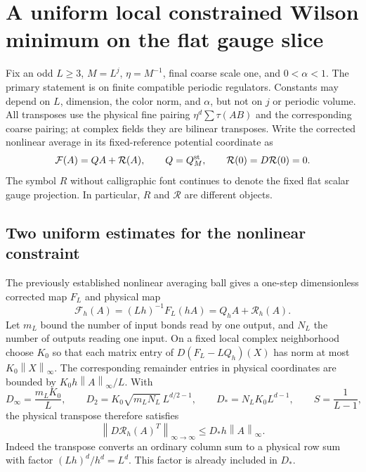 \documentclass[11pt]{article}
\theoremstyle{remark}\newtheorem{remark}[theorem]{Remark}
\newcommand{\norm}[1]{\left\lVert#1\right\rVert}
\begin{document}

\section{A uniform local constrained Wilson minimum on the flat gauge slice}
\label{nm-section}

Fix an odd $L\ge3$, $M=L^j$, $\eta=M^{-1}$, final coarse scale one,
and $0<\alpha<1$. The primary statement is on finite compatible
periodic regulators. Constants may depend on $L$, dimension, the
color norm, and $\alpha$, but not on $j$ or periodic volume. All
transposes use the physical fine pairing $\eta^d\sum\tau(AB)$ and
the corresponding coarse pairing; at complex fields they are
bilinear transposes. Write the corrected nonlinear average in its
fixed-reference potential coordinate as
\begin{equation}\label{nm-average}
 \mathcal F(A)=QA+\mathcal R(A),\qquad Q=Q_M^{\rm st},\qquad
 \mathcal R(0)=D\mathcal R(0)=0.
\end{equation}
The symbol $R$ without calligraphic font continues to denote the
fixed flat scalar gauge projection. In particular, $R$ and
$\mathcal R$ are different objects.

\subsection{Two uniform estimates for the nonlinear constraint}
\label{nm-average-estimates}

The previously established nonlinear averaging ball gives a
one-step dimensionless corrected map $F_L$ and physical map
\begin{equation}\label{nm-one-step}
 \mathcal F_h(A)=(Lh)^{-1}F_L(hA)=Q_hA+\mathcal R_h(A).
\end{equation}
Let $m_L$ bound the number of input bonds read by one output, and
$N_L$ the number of outputs reading one input. On a fixed local
complex neighborhood choose $K_0$ so that each matrix entry of
$D(F_L-LQ_h)(X)$ has norm at most $K_0\norm{X}_\infty$.
The corresponding remainder entries in physical coordinates are
bounded by $K_0h\norm{A}_\infty/L$. With
\begin{equation}\label{nm-local-constants}
 D_\infty=\frac{m_LK_0}{L},\qquad
 D_2=K_0\sqrt{m_LN_L}\,L^{d/2-1},\qquad
 D_*=N_LK_0L^{d-1},\qquad S=\frac1{L-1},
\end{equation}
the physical transpose therefore satisfies
\begin{equation}\label{nm-adjoint-one-step}
 \norm{D\mathcal R_h(A)^T}_{\infty\to\infty}
 \le D_*h\norm{A}_\infty.
\end{equation}
Indeed the transpose converts an ordinary column sum to a physical
row sum with factor $(Lh)^d/h^d=L^d$. This factor is already
included in $D_*$.
\end{document}
